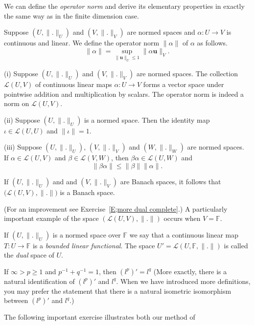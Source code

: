We can define the \emph{operator norm}
and derive its elementary properties in exactly
the same way as in the finite dimension case.
\begin{definition} Suppose $(U,\|.\|_{U})$ and
$(V,\|.\|_{V})$ are normed spaces
and $\alpha:U\rightarrow V$ is continuous and linear.
We define the operator norm $\|\alpha\|$ of $\alpha$ as
follows.
\[\|\alpha\|=\sup_{\|{\mathbf u}\|_{U}\leq 1}\|\alpha{\mathbf u}\|_{V}.\]
\end{definition}
\begin{exercise} (i) Suppose $(U,\|.\|_{U})$ and
$(V,\|.\|_{V})$ are normed spaces. The collection
${\mathcal L}(U,V)$ 
of continuous linear maps $\alpha:U\rightarrow V$
forms a vector space under 
pointwise addition and multiplication by scalars.
The operator norm is indeed a norm on ${\mathcal L}(U,V)$.

(ii) Suppose $(U,\|.\|_{U})$ is
a normed space. Then the identity map $\iota\in{\mathcal L}(U,U)$
and $\|\iota\|=1$.

(iii) Suppose $(U,\|.\|_{U})$,
$(V,\|.\|_{V})$ and $(W,\|.\|_{W})$ are normed spaces.
If $\alpha\in {\mathcal L}(U,V)$ and $\beta\in{\mathcal L}(V,W)$,
then $\beta\alpha\in {\mathcal L}(U,W)$ and
\[\|\beta\alpha\|\leq \|\beta\|\|\alpha\|.\]
\end{exercise}
\begin{theorem}\label{T;dual complete} If $(U,\|.\|_{U})$ and
and $(V,\|.\|_{V})$ are Banach spaces, it follows that
$\big({\mathcal L}(U,V),\|.\|\big)$ is a Banach space.
\end{theorem}
(For an improvement see Exercise~\ref{E;more dual complete}.)
A particularly important example of 
the space $({\mathcal L}(U,V),\|.\|)$
occurs when $V={\mathbb F}$.
\begin{definition} If $(U,\|.\|_{U})$ is a normed space
over ${\mathbb F}$ we say that a continuous
linear map $T:U\rightarrow{\mathbb F}$
is a \emph{bounded linear functional}.
The space $U'={\mathcal L}(U,{\mathbb F},\|.\|)$
is called the \emph{dual} space of $U$.
\end{definition}
\begin{theorem}\label{T;dual p} If $\infty>p\geq 1$ 
and $p^{-1}+q^{-1}=1$, then $({l^{p}})'=l^{q}$
(More exactly, there is a natural identification
of $({l^{p}})'$ and $l^{q}$. When we have introduced more definitions,
you may prefer the statement that there is a natural isometric
isomorphism between  $({l^{p}})'$ and $l^{q}$.)
\end{theorem}
The following important exercise illustrates both our method of
